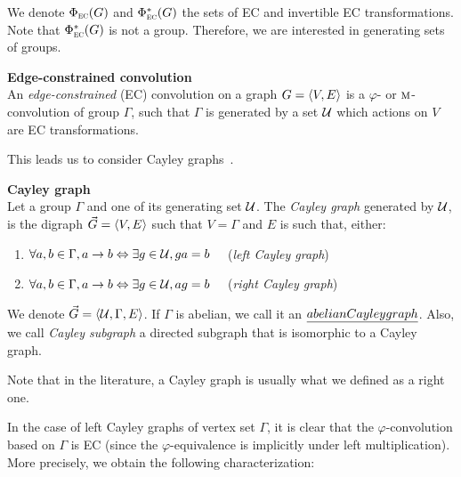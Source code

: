 We denote $\Phi_{\operatorname{\textsc{ec}}}(G)$ and $\Phi^*_{\operatorname{\textsc{ec}}}(G)$ the sets of EC and invertible EC transformations. Note that $\Phi^*_{\operatorname{\textsc{ec}}}(G)$ is not a group. Therefore, we are interested in generating sets of groups.

\begin{definition}\textbf{Edge-constrained convolution}\\
An \emph{edge-constrained} (EC) convolution on a graph $G = \langle V, E \rangle$ is a $\varphi$- or $\operatorname{\textsc{m}}$-convolution of group $\Gamma$, such that $\Gamma$ is generated by a set $\mathcal{U}$ which actions on $V$ are EC transformations.
\end{definition}

This leads us to consider Cayley graphs~\citep{cayley1878desiderata}.%

\begin{definition}\textbf{Cayley graph}\\
Let a group $\Gamma$ and one of its generating set $\mathcal{U}$. The \emph{Cayley graph} generated by $\mathcal{U}$, is the digraph $\vec{G} = \langle V, E \rangle$ such that $V = \Gamma$ and $E$ is such that, either:
\begin{enumerate}[nolistsep,noitemsep,label=(\roman*)]
\item $\forall a,b \in \Gamma, a \rightarrow b \Leftrightarrow \exists g \in \mathcal{U}, ga = b \quad$ (\emph{left Cayley graph})
\item $\forall a,b \in \Gamma, a \rightarrow b \Leftrightarrow \exists g \in \mathcal{U}, ag = b \quad$ (\emph{right Cayley graph})
\end{enumerate}
We denote $\vec{G} = \langle \mathcal{U}, \Gamma, E \rangle$. If $\Gamma$ is abelian, we call it an $\emph{abelian Cayley graph}$.
Also, we call \emph{Cayley subgraph} a directed subgraph that is isomorphic to a Cayley graph.
\end{definition}

\begin{remark}
Note that in the literature, a Cayley graph is usually what we defined as a right one. %
\end{remark}

In the case of left Cayley graphs of vertex set $\Gamma$, it is clear that the $\varphi$-convolution based on $\Gamma$ is EC (since the $\varphi$-equivalence is implicitly under left multiplication).
More precisely, we obtain the following characterization:

